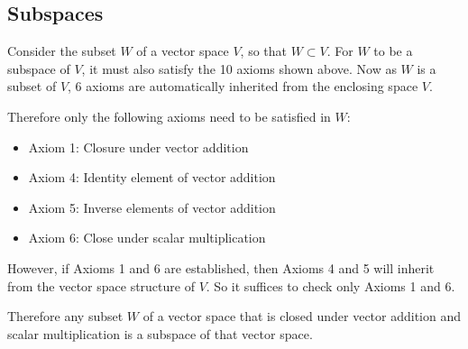 \documentclass{article}
\begin{document}
\subsection{Subspaces}
Consider the subset \(W\) of a vector space \(V\), so that \(W \subset V\).
For \(W\) to be a subspace of \(V\), it must also satisfy the 10 axioms shown above.
Now as \(W\) is a subset of \(V\), 6 axioms are automatically inherited from the enclosing space \(V\).

Therefore only the following axioms need to be satisfied in \(W\):
\begin{itemize}
    \item Axiom 1: Closure under vector addition
    \item Axiom 4: Identity element of vector addition
    \item Axiom 5: Inverse elements of vector addition
    \item Axiom 6: Close under scalar multiplication
\end{itemize}
However, if Axioms 1 and 6 are established, then Axioms 4 and 5 will inherit from
the vector space structure of \(V\). So it suffices to check only Axioms 1 and 6.

Therefore any subset \(W\) of a vector space that is closed under vector addition and scalar multiplication is a subspace
of that vector space.
\end{document}
